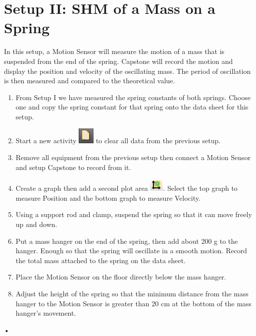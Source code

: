\documentclass[main.tex]{subfiles}
\begin{document}
\section{Setup II: SHM of a Mass on a Spring}
In this setup, a Motion Sensor will measure the motion of a mass that is suspended from the end of the spring. Capstone will record the motion and display the position and velocity of the oscillating mass. The period of oscillation is then measured and compared to the theoretical value.

\begin{enumerate}
\item
From Setup I we have measured the spring constants of both springs. Choose one and copy the spring constant for that spring onto the data sheet for this setup.
\item
Start a new activity \includegraphics{New_Experiment} to clear all data from the previous setup.
\item
Remove all equipment from the previous setup then connect a Motion Sensor  and setup Capstone to record from it.
\item
Create a graph then add a second plot area \includegraphics{Add_New_Plot}. Select the top graph to measure Position and the bottom graph to measure Velocity.
\item
Using a support rod and clamp, suspend the spring so that it can move freely up and down.
\item
Put a mass hanger on the end of the spring, then add about 200 g to the hanger. Enough so that the spring will oscillate in a smooth motion. Record the total mass attached to the spring on the data sheet.
\item
Place the Motion Sensor on the floor directly below the mass hanger.
\item
Adjust the height of the spring so that the minimum distance from the mass hanger to the Motion Sensor is greater than 20 cm at the bottom of the mass hanger's movement.
\end{enumerate}•
\end{document}
